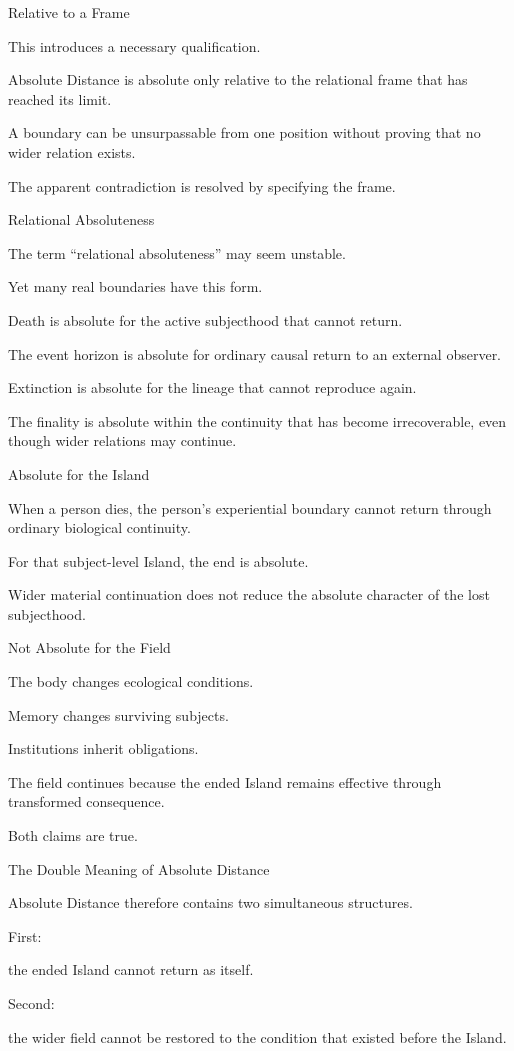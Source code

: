 Relative to a Frame

This introduces a necessary qualification.

Absolute Distance is absolute only relative to the relational frame that has reached its limit.

A boundary can be unsurpassable from one position without proving that no wider relation exists.

The apparent contradiction is resolved by specifying the frame.

Relational Absoluteness

The term “relational absoluteness” may seem unstable.

Yet many real boundaries have this form.

Death is absolute for the active subjecthood that cannot return.

The event horizon is absolute for ordinary causal return to an external observer.

Extinction is absolute for the lineage that cannot reproduce again.

The finality is absolute within the continuity that has become irrecoverable, even though wider relations may continue.

Absolute for the Island

When a person dies, the person’s experiential boundary cannot return through ordinary biological continuity.

For that subject-level Island, the end is absolute.

Wider material continuation does not reduce the absolute character of the lost subjecthood.

Not Absolute for the Field

The body changes ecological conditions.

Memory changes surviving subjects.

Institutions inherit obligations.

The field continues because the ended Island remains effective through transformed consequence.

Both claims are true.

The Double Meaning of Absolute Distance

Absolute Distance therefore contains two simultaneous structures.

First:

the ended Island cannot return as itself.

Second:

the wider field cannot be restored to the condition that existed before the Island.

